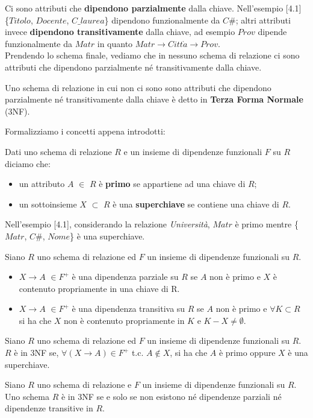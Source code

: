 Ci sono attributi che \textbf{dipendono parzialmente} dalla chiave. Nell'esempio [4.1] 
\{$Titolo$, $Docente$, $C\_laurea$\} dipendono funzionalmente da $C\#$; altri attributi
invece \textbf{dipendono transitivamente} dalla chiave, ad esempio $Prov$ dipende
funzionalmente da $Matr$ in quanto $Matr \rightarrow Citt\grave{a} \rightarrow Prov$.\\
Prendendo lo schema finale, vediamo che in nessuno schema di relazione ci sono attributi
che dipendono parzialmente né transitivamente dalla chiave. 
\begin{prop}
Uno schema di relazione in cui non ci sono sono attributi che dipendono parzialmente né 
transitivamente dalla chiave è detto in \textbf{Terza Forma Normale} (3NF). 
\end{prop}
Formalizziamo i concetti appena introdotti:
\begin{defn}
 Dati uno schema di relazione $R$ e un insieme di dipendenze funzionali $F$ su $R$
diciamo che:
\begin{itemize}
 \item un attributo $A$ $\in$ $R$ è \textbf{primo} se appartiene ad una chiave di $R$;
 \item un sottoinsieme $X$ $\subset$ $R$ è una \textbf{superchiave} se contiene una 
 chiave di $R$.
\end{itemize}
\end{defn}
Nell'esempio [4.1], considerando la relazione \emph{Università}, $Matr$ è primo mentre
 \{$Matr$, $C\#$, $Nome$\} è una superchiave.
\begin{defn}
Siano $R$ uno schema di relazione ed $F$ un insieme di dipendenze funzionali su $R$.
\begin{itemize}
 \item $X\rightarrow A$ $\in F^+$ è una dipendenza parziale su $R$ se $A$ non 
 è primo e $X$ è contenuto propriamente in una chiave di R.
 \item $X\rightarrow A$ $\in F^+$ è una dipendenza transitiva su $R$ se $A$ 
 non è primo e $\forall K \subset R$ si ha che $X$ non è contenuto propriamente 
 in $K$ e $K-X \neq \emptyset$.
\end{itemize}
\end{defn}
\begin{prop}
Siano $R$ uno schema di relazione ed $F$ un insieme di dipendenze funzionali su $R$. 
$R$ è in 3NF se, $\forall (X\rightarrow A) \in F^+$ t.c. $A\notin X$, si ha che $A$ è
primo oppure $X$ è una superchiave.
\end{prop}
\begin{theo}
Siano $R$ uno schema di relazione e $F$ un insieme di dipendenze funzionali su $R$. Uno
schema $R$ è in 3NF se e solo se non esistono né dipendenze parziali né dipendenze 
transitive in $R$.
\end{theo}
